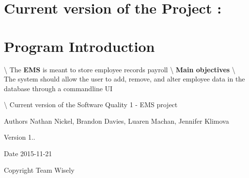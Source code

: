 \hypertarget{index_version}{}\section{Current version of the Project \+:}\label{index_version}
\hypertarget{index_intro}{}\section{Program Introduction}\label{index_intro}
\textbackslash{} The {\bfseries E\+M\+S} is meant to store employee records payroll \textbackslash{} {\bfseries Main objectives} \textbackslash{} The system should allow the user to add, remove, and alter employee data in the database through a commandline U\+I



 \textbackslash{} Current version of the Software Quality 1 -\/ E\+M\+S project 
\begin{DoxyItemize}
\item \begin{DoxyAuthor}{Authors}
Nathan Nickel, Brandon Davies, Luaren Machan, Jennifer Klimova 
\end{DoxyAuthor}

\item \begin{DoxyVersion}{Version}
1.. 
\end{DoxyVersion}

\item \begin{DoxyDate}{Date}
2015-\/11-\/21 
\end{DoxyDate}

\item \begin{DoxyCopyright}{Copyright}
Team Wisely 
\end{DoxyCopyright}

\end{DoxyItemize}